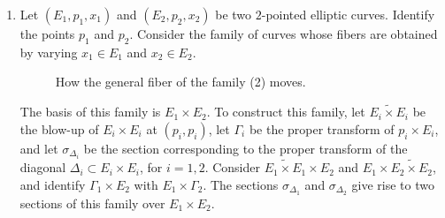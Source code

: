 \documentclass[10pt]{amsart}
\theoremstyle{definition}
\begin{document}
{\begin{enumerate}
The fibers of this family are either smooth or consist of the curve $C$ attached to a rational tail containing the two marked points. An admissible cover of one of the singular fibers has to have a ramification of order at least $2$ at the singular point. By the Riemann-Hurwitz formula, the singular fibers do not admit an admissible cover totally ramified at the marked points. A smooth fiber $(C,p,q)$ has an admissible cover of degree $d$ totally ramified at $p$ and $q$ if and only if $p-q$ is a non-trivial $d$-torsion point in $\textrm{Pic}^0(C)$. Let $\varphi\colon C\times C\rightarrow \textrm{Pic}^0(C)$ be the difference map defined as $\varphi(p,q)=\mathcal{O}_C(p-q)$. The map $\varphi$ is surjective of degree $2$ (see \cite[Chapter V]{MR770932}). It follows that $2(d^4-1)$ fibers of this family are in $\overline{\mathcal{DR}}_2(d)$. Since the admissible cover is uniquely determined, each fiber contributes with multiplicity one. We deduce the following relation
\[
4A_{\psi_1^2+\psi_2^2} + 6A_{\psi_1\psi_2} -2A_{\delta_2^2} = 2(d^4-1).
\]

\item \label{1} Let $(E_1,p_1,x_1)$ and $(E_2,p_2,x_2)$ be two $2$-pointed elliptic curves. Identify the points $p_1$ and $p_2$. Consider the family of curves whose fibers are obtained by varying $x_1\in E_1$ and $x_2\in E_2$.

\begin{figure}[htbp]
\centering
  
  

  \caption{How the general fiber of the family (2) moves.}
\end{figure}

The basis of this family is $E_1\times E_2$. To construct this family, let $\widetilde{E_i\times E_i}$ be the blow-up of $E_i\times E_i$ at $(p_i,p_i)$, let $\Gamma_i$ be the proper transform of ${p_i}\times E_i$, and let $\sigma_{\Delta_i}$ be the section corresponding to the proper transform of the diagonal $\Delta_i\subset E_i\times E_i$, for $i=1,2$. Consider $\widetilde{E_1\times E_1}\times E_2$ and $E_1\times \widetilde{E_2\times E_2}$, and identify $\Gamma_1\times E_2$ with $E_1\times\Gamma_2$. The sections $\sigma_{\Delta_1}$ and $\sigma_{\Delta_2}$ give rise to two sections of this family over $E_1\times E_2$.


\end{enumerate}}
\end{document}
